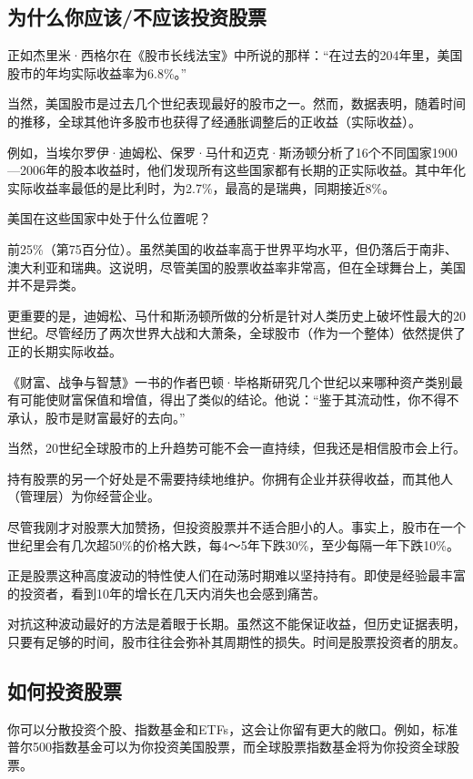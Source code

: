 \subsection{为什么你应该/不应该投资股票}
正如杰里米·西格尔在《股市长线法宝》中所说的那样：“在过去的204年里，美国股市的年均实际收益率为6.8\%。”

当然，美国股市是过去几个世纪表现最好的股市之一。然而，数据表明，随着时间的推移，全球其他许多股市也获得了经通胀调整后的正收益（实际收益）。

例如，当埃尔罗伊·迪姆松、保罗·马什和迈克·斯汤顿分析了16个不同国家1900—2006年的股本收益时，他们发现所有这些国家都有长期的正实际收益。其中年化实际收益率最低的是比利时，为2.7\%，最高的是瑞典，同期接近8\%。

美国在这些国家中处于什么位置呢？

前25\%（第75百分位）。虽然美国的收益率高于世界平均水平，但仍落后于南非、澳大利亚和瑞典。这说明，尽管美国的股票收益率非常高，但在全球舞台上，美国并不是异类。

更重要的是，迪姆松、马什和斯汤顿所做的分析是针对人类历史上破坏性最大的20世纪。尽管经历了两次世界大战和大萧条，全球股市（作为一个整体）依然提供了正的长期实际收益。

《财富、战争与智慧》一书的作者巴顿·毕格斯研究几个世纪以来哪种资产类别最有可能使财富保值和增值，得出了类似的结论。他说：“鉴于其流动性，你不得不承认，股市是财富最好的去向。”

当然，20世纪全球股市的上升趋势可能不会一直持续，但我还是相信股市会上行。

持有股票的另一个好处是不需要持续地维护。你拥有企业并获得收益，而其他人（管理层）为你经营企业。

尽管我刚才对股票大加赞扬，但投资股票并不适合胆小的人。事实上，股市在一个世纪里会有几次超50\%的价格大跌，每4～5年下跌30\%，至少每隔一年下跌10\%。

正是股票这种高度波动的特性使人们在动荡时期难以坚持持有。即使是经验最丰富的投资者，看到10年的增长在几天内消失也会感到痛苦。

对抗这种波动最好的方法是着眼于长期。虽然这不能保证收益，但历史证据表明，只要有足够的时间，股市往往会弥补其周期性的损失。时间是股票投资者的朋友。

\subsection{如何投资股票}
你可以分散投资个股、指数基金和ETFs，这会让你留有更大的敞口。例如，标准普尔500指数基金可以为你投资美国股票，而全球股票指数基金将为你投资全球股票。

